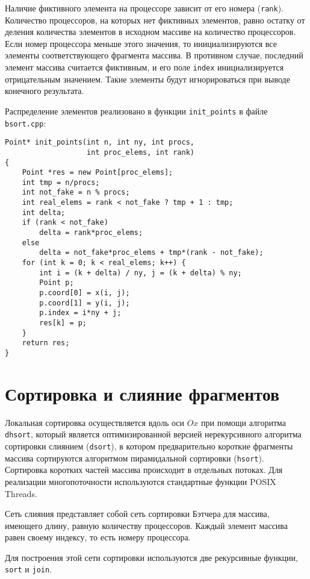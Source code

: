 \documentclass[oneside,final,14pt]{extreport}
\begin{document}
Наличие фиктивного элемента на процессоре зависит от его номера (\texttt{rank}).
Количество процессоров, на которых нет фиктивных элементов, равно остатку от
деления количества элементов в исходном массиве на количество процессоров.
Если номер процессора меньше этого значения, то инициализируются все элементы
соответствующего фрагмента массива. В противном случае, последний элемент
массива считается фиктивным, и его поле \texttt{index} инициализируется
отрицательным значением. Такие элементы будут игнорироваться при выводе
конечного результата.

Распределение элементов реализовано в функции \texttt{init\_points} в
файле \texttt{bsort.cpp}:

\begin{verbatim}
Point* init_points(int n, int ny, int procs,
                   int proc_elems, int rank)
{
    Point *res = new Point[proc_elems];
    int tmp = n/procs;
    int not_fake = n % procs;
    int real_elems = rank < not_fake ? tmp + 1 : tmp;
    int delta;
    if (rank < not_fake)
        delta = rank*proc_elems;
    else
        delta = not_fake*proc_elems + tmp*(rank - not_fake);
    for (int k = 0; k < real_elems; k++) {
        int i = (k + delta) / ny, j = (k + delta) % ny;
        Point p;
        p.coord[0] = x(i, j);
        p.coord[1] = y(i, j);
        p.index = i*ny + j;
        res[k] = p;
    }
    return res;
}
\end{verbatim}

\section*{Сортировка и слияние фрагментов}

Локальная сортировка осуществляется вдоль оси $Ox$ при помощи алгоритма \texttt{dhsort},
который является оптимизированной версией нерекурсивного алгоритма сортировки
слиянием (\texttt{dsort}), в котором предварительно короткие фрагменты
массива сортируются алгоритмом пирамидальной сортировки (\texttt{hsort}).
Сортировка коротких частей массива происходит в отдельных потоках.
Для реализации многопоточности используются стандартные функции
POSIX Threads.

Сеть слияния представляет собой сеть сортировки Бэтчера для массива, имеющего
длину, равную количеству процессоров. Каждый элемент массива равен своему индексу,
то есть номеру процессора.

Для построения этой сети сортировки используются две рекурсивные функции,
\texttt{sort} и \texttt{join}.
\end{document}
